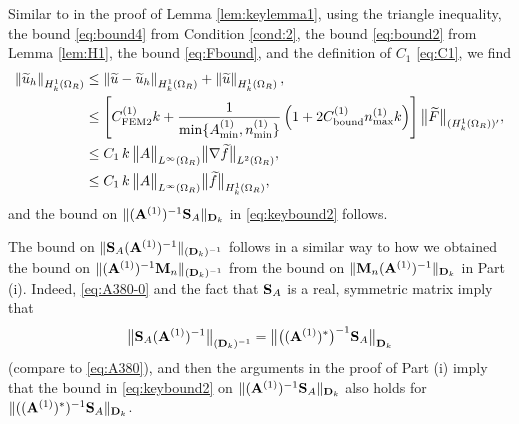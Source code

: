 \documentclass[10pt]{article}%
\numberwithin{equation}{section}
\newcommand{\beq}{\begin{equation}}
\newcommand{\eeq}{\end{equation}}
\newcommand{\beqs}{\begin{equation*}}
\newcommand{\eeqs}{\end{equation*}}
\newcommand{\bu}{\mathbf{u}}
\newcommand{\bff}{\mathbf{f}}
\newcommand{\eps}{\varepsilon}
\newcommand{\OR}{{\Omega_R}}
\newcommand{\HoDkk}{{H^1_{k}(\domain_R)}}
\newcommand*{\N}[1]{\left\|#1\right\|}
\newcommand{\domain}{\Omega}
\newcommand{\matrixD}{{\bf D}}
\newcommand{\matrixS}{{\bf S}}
\newcommand{\matrixM}{{\bf M}}
\newcommand{\matrixAo}{{\bf A}^{(1)}}
\newcommand{\coeffAo}{A^{(1)}}
\newcommand{\coeffno}{n^{(1)}}
\newcommand{\tu}{\widetilde{u}}
\newcommand{\tbu}{\widetilde{\bu}}
\begin{document}
Similar to in the proof of Lemma \ref{lem:keylemma1},
using the triangle inequality, the bound \eqref{eq:bound4} from Condition \ref{cond:2}, the bound \eqref{eq:bound2} from Lemma \ref{lem:H1}, the bound \eqref{eq:Fbound}, and the definition of $C_1$ \eqref{eq:C1},
we find
\begin{align}\nonumber 
\N{\tu_h}_{\HoDkk} &\leq
\N{\tu-\tu_h}_{\HoDkk} + \N{\tu}_{\HoDkk},\nonumber \\ \nonumber
& \leq \left[ C^{(1)}_{\rm FEM2} k + 
\frac{1}{\min\{\coeffAo_{\min},\coeffno_{\min}\}}\left( 1 + 2 C^{(1)}_{\rm bound}\coeffno_{\max}k  \right) 
\right]\big\|\widetilde{F}\big\|_{(\HoDkk)'},\\
&\leq C_1 \, k\, 
\big\|A\big\|_{L^\infty(\OR)} \big\|\nabla\widetilde{f}\big\|_{L^2(\OR)},\label{eq:mainevent2}\\
&\leq C_1 \, k\, 
\big\|A\big\|_{L^\infty(\OR)} \big\|\widetilde{f}\big\|_{\HoDkk},\nonumber
\end{align}
and the bound on $\|(\matrixAo)^{-1}\matrixS_A\|_{\matrixD_k}$ in \eqref{eq:keybound2} follows.

The bound on $\|\matrixS_A(\matrixAo)^{-1}\|_{(\matrixD_k)^{-1}}$ follows in a similar way to how we obtained the 
bound on  $\|(\matrixAo)^{-1}\matrixM_n\|_{(\matrixD_k)^{-1}}$ from the bound on $\|\matrixM_n(\matrixAo)^{-1}\|_{\matrixD_k}$ in Part (i). Indeed, 
\eqref{eq:A380-0} and the fact that $\matrixS_A$ is a real, symmetric matrix imply that 
\beq\label{eq:A380-2} 
 \big\|\matrixS_A (\matrixAo)^{-1}\big\|_{(\matrixD_k)^{-1}}=\big\|\big((\matrixAo)^*\big)^{-1}\matrixS_A\big\|_{\matrixD_k}
 \eeq 
(compare to \eqref{eq:A380}),
and then the arguments in the proof of Part (i) imply that 
the bound in \eqref{eq:keybound2} on $\|(\matrixAo)^{-1}\matrixS_A\|_{\matrixD_k}$ also holds for $\|((\matrixAo)^*)^{-1}\matrixS_A\|_{\matrixD_k}$.
\end{document}
